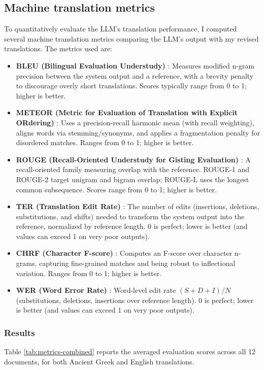 \subsection{Machine translation metrics} \label{sec:metrics}
To quantitatively evaluate the LLM's translation performance, I computed several machine translation metrics comparing the LLM's output with my revised translations.
The metrics used are:
\begin{itemize}
  \item \textbf{BLEU (Bilingual Evaluation Understudy)} \cite{bleu}: Measures modified n\mbox{-}gram precision between the system output and a reference, with a brevity penalty to discourage overly short translations. Scores typically range from 0 to 1; higher is better.
  \item \textbf{METEOR (Metric for Evaluation of Translation with Explicit ORdering)} \cite{meteor}: Uses a precision-recall harmonic mean (with recall weighting), aligns words via stemming/synonyms, and applies a fragmentation penalty for disordered matches. Ranges from 0 to 1; higher is better.
  \item \textbf{ROUGE (Recall-Oriented Understudy for Gisting Evaluation)} \cite{rouge}: A recall-oriented family measuring overlap with the reference. ROUGE-1 and ROUGE-2 target unigram and bigram overlap; ROUGE-L uses the longest common subsequence. Scores range from 0 to 1; higher is better.
  \item \textbf{TER (Translation Edit Rate)} \cite{ter}: The number of edits (insertions, deletions, substitutions, and shifts) needed to transform the system output into the reference, normalized by reference length. $0$ is perfect; lower is better (and values can exceed 1 on very poor outputs).
  \item \textbf{CHRF (Character F-score)} \cite{chrf}: Computes an F-score over character n-grams, capturing fine-grained matches and being robust to inflectional variation. Ranges from 0 to 1; higher is better.
  \item \textbf{WER (Word Error Rate)} \cite{wer}: Word-level edit rate $(S{+}D{+}I)/N$ (substitutions, deletions, insertions over reference length). $0$ is perfect; lower is better (and values can exceed 1 on very poor outputs).
\end{itemize}

\subsubsection{Results}
Table \ref{tab:metrics-combined} reports the averaged evaluation scores across all 12 documents, 
for both Ancient Greek and English translations. 

